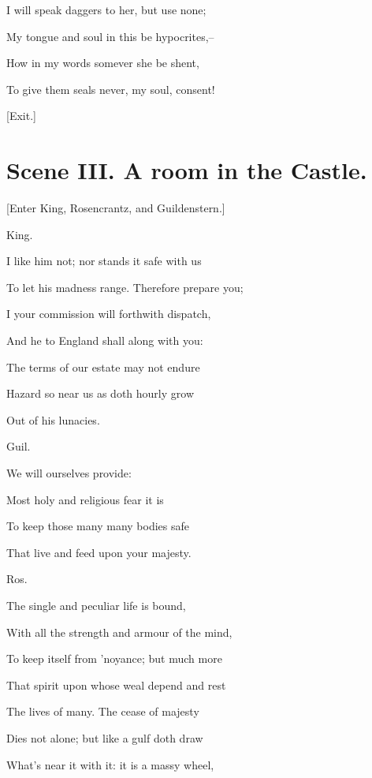 \documentclass[12pt]{book}
\begin{document}
I will speak daggers to her, but use none;

My tongue and soul in this be hypocrites,--

How in my words somever she be shent,

To give them seals never, my soul, consent!



[Exit.]







\section*{Scene III. A room in the Castle.}



[Enter King, Rosencrantz, and Guildenstern.]



King.

I like him not; nor stands it safe with us

To let his madness range. Therefore prepare you;

I your commission will forthwith dispatch,

And he to England shall along with you:

The terms of our estate may not endure

Hazard so near us as doth hourly grow

Out of his lunacies.



Guil.

We will ourselves provide:

Most holy and religious fear it is

To keep those many many bodies safe

That live and feed upon your majesty.



Ros.

The single and peculiar life is bound,

With all the strength and armour of the mind,

To keep itself from 'noyance; but much more

That spirit upon whose weal depend and rest

The lives of many. The cease of majesty

Dies not alone; but like a gulf doth draw

What's near it with it: it is a massy wheel,
\end{document}
